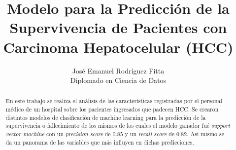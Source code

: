 \documentclass[6pt, twocolumn]{article}
\title{Modelo para la Predicción de la Supervivencia de Pacientes con Carcinoma Hepatocelular (HCC)}
\author{José Emanuel Rodríguez Fitta\\
  \small Diplomado en Ciencia de Datos\\
  \date{}
}
\begin{document}
\maketitle

\begin{abstract}
En este trabajo se realiza el análisis de las características registradas por el personal médico de un hospital sobre los pacientes ingresados que padecen HCC. Se crearon distintos modelos de clasificación de machine learning para la predicción de la supervivencia o fallecimiento de los mismos de los cuales el modelo ganador fué \textit{support vector machine} con un \textit{precision score} de $0.85$ y un \textit{recall score} de $0.82$. Así mismo se da un panorama de las variables que más influyen en dichas predicciones.
\end{abstract}

\end{document}
